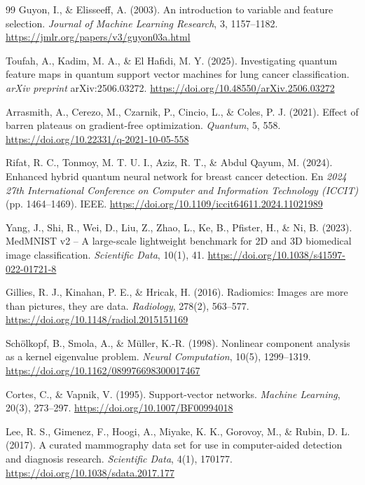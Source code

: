 \begin{thebibliography}{99}
    Guyon, I., \& Elisseeff, A. (2003).
    An introduction to variable and feature selection.
    \textit{Journal of Machine Learning Research}, 3, 1157--1182.
    \url{https://jmlr.org/papers/v3/guyon03a.html}

    Toufah, A., Kadim, M. A., \& El Hafidi, M. Y. (2025).
    Investigating quantum feature maps in quantum support vector machines for lung cancer classification.
    \textit{arXiv preprint} arXiv:2506.03272.
    \url{https://doi.org/10.48550/arXiv.2506.03272}

    Arrasmith, A., Cerezo, M., Czarnik, P., Cincio, L., \& Coles, P. J. (2021).
    Effect of barren plateaus on gradient-free optimization.
    \textit{Quantum}, 5, 558.
    \url{https://doi.org/10.22331/q-2021-10-05-558}

    Rifat, R. C., Tonmoy, M. T. U. I., Aziz, R. T., \& Abdul Qayum, M. (2024).
    Enhanced hybrid quantum neural network for breast cancer detection.
    En \textit{2024 27th International Conference on Computer and Information Technology (ICCIT)} (pp. 1464--1469). IEEE.
    \url{https://doi.org/10.1109/iccit64611.2024.11021989}

    Yang, J., Shi, R., Wei, D., Liu, Z., Zhao, L., Ke, B., Pfister, H., \& Ni, B. (2023).
    MedMNIST v2 -- A large-scale lightweight benchmark for 2D and 3D biomedical image classification.
    \textit{Scientific Data}, 10(1), 41.
    \url{https://doi.org/10.1038/s41597-022-01721-8}

    Gillies, R. J., Kinahan, P. E., \& Hricak, H. (2016).
    Radiomics: Images are more than pictures, they are data.
    \textit{Radiology}, 278(2), 563--577.
    \url{https://doi.org/10.1148/radiol.2015151169}

    Sch{\"o}lkopf, B., Smola, A., \& M{\"u}ller, K.-R. (1998).
    Nonlinear component analysis as a kernel eigenvalue problem.
    \textit{Neural Computation}, 10(5), 1299--1319.
    \url{https://doi.org/10.1162/089976698300017467}

    Cortes, C., \& Vapnik, V. (1995).
    Support-vector networks.
    \textit{Machine Learning}, 20(3), 273--297.
    \url{https://doi.org/10.1007/BF00994018}

    Lee, R. S., Gimenez, F., Hoogi, A., Miyake, K. K., Gorovoy, M., \& Rubin, D. L. (2017).
    A curated mammography data set for use in computer-aided detection and diagnosis research.
    \textit{Scientific Data}, 4(1), 170177.
    \url{https://doi.org/10.1038/sdata.2017.177}


\end{thebibliography}

